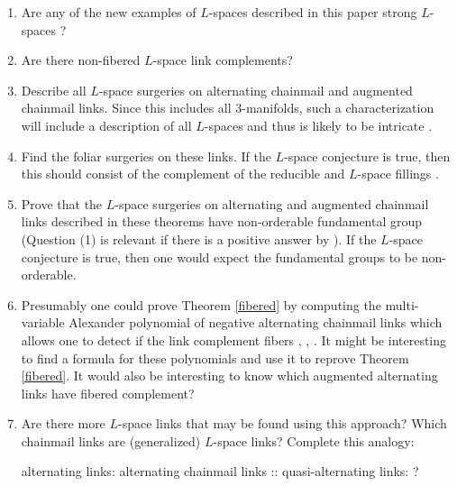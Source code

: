 \documentclass{amsart}
\theoremstyle{definition}
\theoremstyle{remark}
\begin{document}
\begin{enumerate}
\item
Are any of the new examples of $L$-spaces described in this paper strong $L$-spaces \cite{Greene_2016}? 
\item
Are there non-fibered $L$-space link complements?
\item
Describe all $L$-space surgeries on alternating chainmail and augmented chainmail links. Since this includes all 3-manifolds, such a characterization will include a description of all $L$-spaces and thus is likely to be intricate \cite{GORSKY2018386}. 

\item
Find the foliar surgeries on these links. If the $L$-space conjecture is true, then this should consist of the complement of the reducible and $L$-space fillings \cite[Conjecture 5]{MR3381327}. 

\item
Prove that the $L$-space surgeries on alternating and augmented chainmail links described in these theorems have non-orderable fundamental group (Question (1) is relevant if there is a positive answer by \cite{levine_lewallen_2013}). If the $L$-space conjecture is true, then one would expect the fundamental groups to be non-orderable. 

\item
Presumably one could prove Theorem \ref{fibered} by computing the multi-variable Alexander polynomial of negative alternating chainmail links which allows one to detect if the link complement fibers \cite[Corollary 1.2]{MR2357503}, \cite{MR2507641}, \cite[Theorem 1.2]{MR2393424}. It might be interesting to find a formula for these polynomials and use it to reprove Theorem \ref{fibered}. It would also be interesting to know which augmented alternating links have fibered complement? 


\item
Are there more $L$-space links that may be found using this approach? Which chainmail links are (generalized) $L$-space links? Complete this analogy: 

\begin{center} 
alternating links: alternating chainmail links :: quasi-alternating links: ? 
\end{center}
\end{enumerate}











%
%

\end{document}
